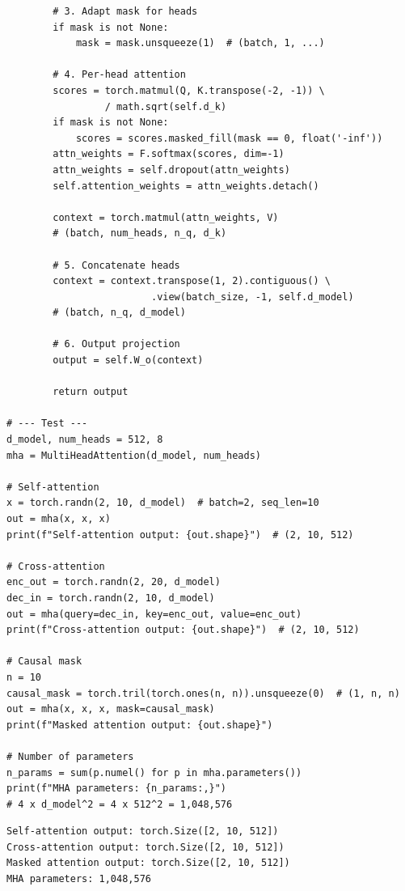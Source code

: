 \begin{codeblock}[title=\textbf{Complete Multi-Head Attention}]
\begin{verbatim}
        # 3. Adapt mask for heads
        if mask is not None:
            mask = mask.unsqueeze(1)  # (batch, 1, ...)

        # 4. Per-head attention
        scores = torch.matmul(Q, K.transpose(-2, -1)) \
                 / math.sqrt(self.d_k)
        if mask is not None:
            scores = scores.masked_fill(mask == 0, float('-inf'))
        attn_weights = F.softmax(scores, dim=-1)
        attn_weights = self.dropout(attn_weights)
        self.attention_weights = attn_weights.detach()

        context = torch.matmul(attn_weights, V)
        # (batch, num_heads, n_q, d_k)

        # 5. Concatenate heads
        context = context.transpose(1, 2).contiguous() \
                         .view(batch_size, -1, self.d_model)
        # (batch, n_q, d_model)

        # 6. Output projection
        output = self.W_o(context)

        return output

# --- Test ---
d_model, num_heads = 512, 8
mha = MultiHeadAttention(d_model, num_heads)

# Self-attention
x = torch.randn(2, 10, d_model)  # batch=2, seq_len=10
out = mha(x, x, x)
print(f"Self-attention output: {out.shape}")  # (2, 10, 512)

# Cross-attention
enc_out = torch.randn(2, 20, d_model)
dec_in = torch.randn(2, 10, d_model)
out = mha(query=dec_in, key=enc_out, value=enc_out)
print(f"Cross-attention output: {out.shape}")  # (2, 10, 512)

# Causal mask
n = 10
causal_mask = torch.tril(torch.ones(n, n)).unsqueeze(0)  # (1, n, n)
out = mha(x, x, x, mask=causal_mask)
print(f"Masked attention output: {out.shape}")

# Number of parameters
n_params = sum(p.numel() for p in mha.parameters())
print(f"MHA parameters: {n_params:,}")
# 4 x d_model^2 = 4 x 512^2 = 1,048,576
\end{verbatim}
\end{codeblock}

\begin{codeoutput}
\begin{verbatim}
Self-attention output: torch.Size([2, 10, 512])
Cross-attention output: torch.Size([2, 10, 512])
Masked attention output: torch.Size([2, 10, 512])
MHA parameters: 1,048,576
\end{verbatim}
\end{codeoutput}

